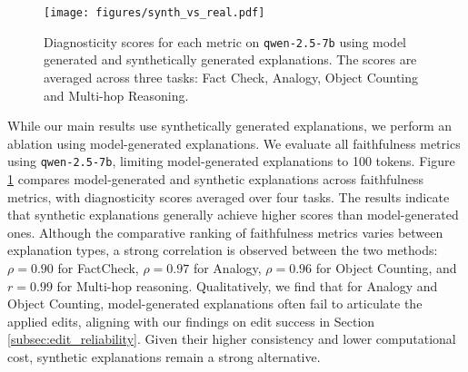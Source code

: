 \begin{figure}
    \centering
    \texttt{[image: figures/synth\_vs\_real.pdf]}
    \caption{Diagnosticity scores for each metric on \texttt{qwen-2.5-7b} using model generated and synthetically generated explanations. The scores are averaged across three tasks: Fact Check, Analogy, Object Counting and Multi-hop Reasoning.}
    \label{fig:explanation_types}
\end{figure}

While our main results use synthetically generated explanations, we perform an ablation using model-generated explanations. We evaluate all faithfulness metrics using \texttt{qwen-2.5-7b}, limiting model-generated explanations to 100 tokens. Figure \ref{fig:explanation_types} compares model-generated and synthetic explanations across faithfulness metrics, with diagnosticity scores averaged over four tasks. The results indicate that synthetic explanations generally achieve higher scores than model-generated ones. Although the comparative ranking of faithfulness metrics varies between explanation types, a strong correlation is observed between the two methods: $\rho = 0.90$ for FactCheck, $\rho = 0.97$ for Analogy, $\rho = 0.96$ for Object Counting, and $r=0.99$ for Multi-hop reasoning. Qualitatively, we find that for Analogy and Object Counting, model-generated explanations often fail to articulate the applied edits, aligning with our findings on edit success in Section \ref{subsec:edit_reliability}. Given their higher consistency and lower computational cost, synthetic explanations remain a strong alternative. 
